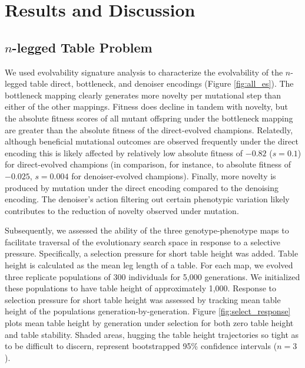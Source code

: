 \section{Results and Discussion} \label{sec:results}

\subsection{$n$-legged Table Problem}



We used evolvability signature analysis to characterize the evolvability of the $n$-legged table direct, bottleneck, and denoiser encodings (Figure \ref{fig:all_es}).
The bottleneck mapping clearly generates more novelty per mutational step than either of the other mappings.
Fitness does decline in tandem with novelty, but the absolute fitness scores of all mutant offspring under the bottleneck mapping are greater than the absolute fitness of the direct-evolved champions.
Relatedly, although beneficial mutational outcomes are observed frequently under the direct encoding this is likely affected by relatively low absolute fitness of $-0.82$ ($s=0.1$) for direct-evolved champions (in comparison, for instance, to absolute fitness of $-0.025$, $s=0.004$ for denoiser-evolved champions).
Finally, more novelty is produced by mutation under the direct encoding compared to the denoising encoding.
The denoiser's action filtering out certain phenotypic variation likely contributes to the reduction of novelty observed under mutation.



Subsequently, we assessed the ability of the three genotype-phenotype maps to facilitate traversal of the evolutionary search space in response to a selective pressure.
Specifically, a selection pressure for short table height was added.
Table height is calculated as the mean leg length of a table.
For each map, we evolved three replicate populations of 300 individuals for 5,000 generations.
We initialized these populations to have table height of approximately 1,000.
Response to selection pressure for short table height was assessed by tracking mean table height of the populations generation-by-generation.
Figure \ref{fig:select_response} plots mean table height by generation under selection for both zero table height and table stability.
Shaded areas, hugging the table height trajectories so tight as to be difficult to discern, represent bootstrapped 95\% confidence intervals ($n=3$).

